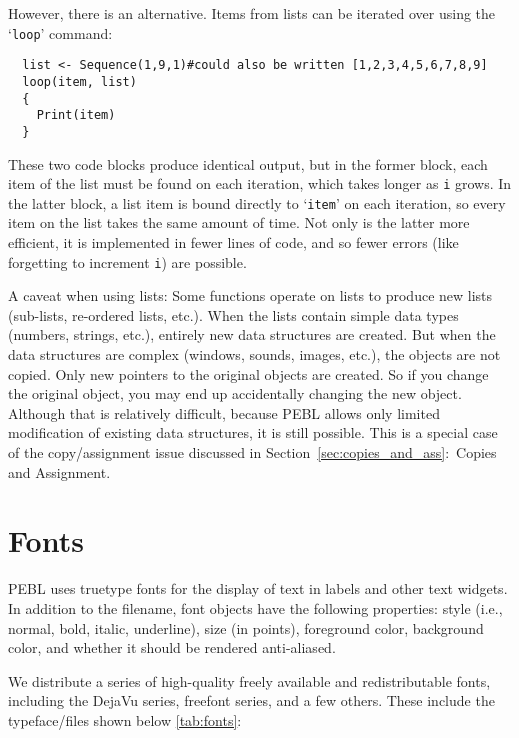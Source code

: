 However, there is an alternative.  Items from
lists can be iterated over using the `\texttt{loop}' command:  
\begin{verbatim}
  list <- Sequence(1,9,1)#could also be written [1,2,3,4,5,6,7,8,9]
  loop(item, list) 
  {
    Print(item)
  }
\end{verbatim}
These two code blocks produce identical output, but in the former block, each item of the list must be found on each iteration, which takes longer as \texttt{i} grows. In the latter block, a list item is bound directly to `\texttt{item}' on each iteration, so every item on the list takes the same amount of time. Not only is the latter more efficient, it is implemented in fewer lines of code, and so fewer errors (like forgetting to increment \texttt{i}) are possible.

A caveat when using lists: Some functions operate on lists to produce
new lists (sub-lists, re-ordered lists, etc.). When the lists contain
simple data types (numbers, strings, etc.), entirely new data
structures are created. But when the data structures are complex
(windows, sounds, images, etc.), the objects are not copied. Only new
pointers to the original objects are created. So if you change the
original object, you may end up accidentally changing the new
object. Although that is relatively difficult, because PEBL allows
only limited modification of existing data structures, it is still
possible. This is a special case of the copy/assignment issue
discussed in Section~\ref{sec:copies_and_ass}:~Copies and Assignment.




\section{Fonts}

PEBL uses truetype fonts for the display of text in labels and other text
widgets.  In addition to the filename, font objects have the following properties: style (i.e., normal, bold, italic, underline), size (in points),
foreground color, background color, and whether it should be rendered
anti-aliased.

We distribute a series of high-quality freely available
and redistributable fonts, including the DejaVu series,
freefont series, and a few others.  These include
the typeface/files shown below \ref{tab:fonts}:

